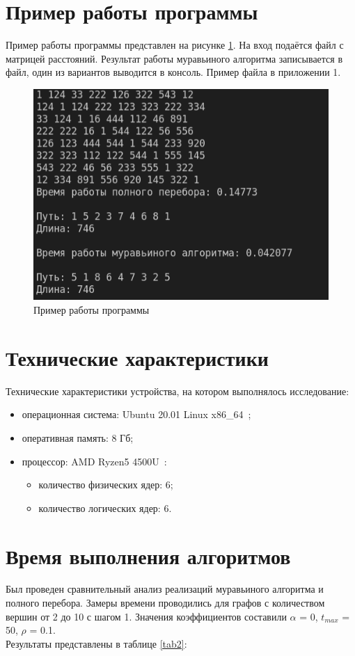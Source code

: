 \documentclass[a4paper,oneside,14pt]{extreport}
\begin{document}
\section{Пример работы программы}
Пример работы программы представлен на рисунке \ref{fig:ex}. На вход подаётся файл с матрицей расстояний. Результат работы муравьиного алгоритма записывается в файл, один из вариантов выводится в консоль. Пример файла в приложении 1.
\captionsetup{singlelinecheck=true}
\begin{figure}[H]
	\centering
	\includegraphics[width=1\linewidth]{images/ex}
	\caption{Пример работы программы}
	\label{fig:ex}
\end{figure}

\section{Технические характеристики}
Технические характеристики устройства, на котором выполнялось исследование:
\begin{itemize}
	\item операционная система: Ubuntu 20.01 Linux x86\_64~\cite{ubuntu};
	\item оперативная память: 8 Гб;
	\item процессор: AMD Ryzen5 4500U~\cite{processor}:
	\begin{itemize}
		\item количество физических ядер: 6;
		\item количество логических ядер: 6.
	\end{itemize}
\end{itemize}

\section{Время выполнения алгоритмов}
Был проведен сравнительный анализ реализаций муравьиного алгоритма и полного перебора. Замеры времени проводились для графов с количеством вершин от 2 до 10 с шагом 1. Значения коэффициентов составили $\alpha$ = 0, $t_{max}$ = 50, $\rho$ = 0.1.\\
Результаты представлены в таблице \ref{tab2}:\\
\end{document}
